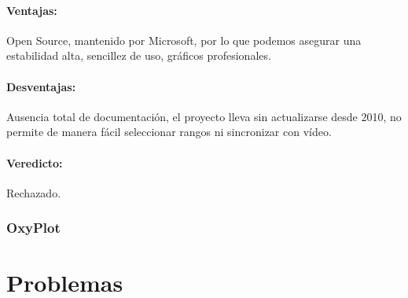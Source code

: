 \paragraph{Ventajas:} Open Source, mantenido por Microsoft, por lo que podemos asegurar una estabilidad alta, sencillez de uso, gr\'{a}ficos profesionales.
\paragraph{Desventajas:} Ausencia total de documentaci\'{o}n, el proyecto lleva sin actualizarse desde 2010, no permite de manera f\'{a}cil seleccionar 
rangos ni sincronizar con v\'{i}deo.
\paragraph{Veredicto:} Rechazado.

\subsubsection{OxyPlot}

\section{Problemas}
